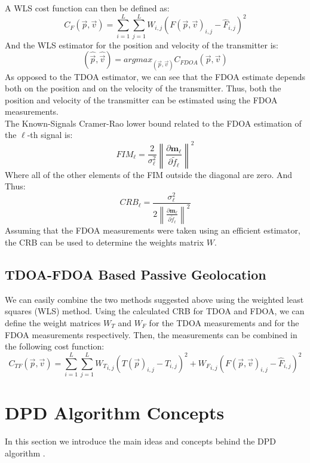 \documentclass[10pt,a4paper]{report}
\begin{document}
A WLS cost function can then be defined as:
\begin{equation}
C_F(\vec{p},\vec{v}) = \sum_{i=1}^L \sum_{j=1}^L W_{i,j}(F(\vec{p},\vec{v})_{i,j}-\hat{F}_{i,j})^2
\end{equation}
And the WLS estimator for the position and velocity of the transmitter is:
\begin{equation}
(\hat{\vec{p}},\hat{\vec{v}}) = argmax_{(\vec{p},\vec{v})}C_{FDOA}(\vec{p},\vec{v})
\end{equation}
As opposed to the TDOA estimator, we can see that the FDOA estimate depends both on the position and on the velocity of the transmitter. Thus, both the position and velocity of the transmitter can be estimated using the FDOA measurements.\\

The Known-Signals Cramer-Rao lower bound related to the FDOA estimation of the $\ell$-th signal is:
\begin{equation}
{FIM}_\ell = \frac{2}{\sigma_\ell^2}\left\|\frac{\partial \mathbf{m_\ell}}{\partial \tilde{f}_\ell}\right\|^2
\end{equation}
Where all of the other elements of the FIM outside the diagonal are zero. And Thus:
\begin{equation}
{CRB}_\ell = \frac{\sigma_\ell^2}{2\left\|\frac{\partial \mathbf{m_\ell}}{\partial \tilde{f}_\ell}\right\|^2}
\end{equation}
Assuming that the FDOA measurements were taken using an efficient estimator, the CRB can be used to determine the weights matrix $W$.

\subsection{TDOA-FDOA Based Passive Geolocation}
We can easily combine the two methods suggested above using the weighted least squares (WLS) method.
Using the calculated CRB for TDOA and FDOA, we can define the weight matrices $W_T$ and $W_F$ for the TDOA measurements and for the FDOA measurements respectively.
Then, the measurements can be combined in the following cost function:
\begin{equation}
C_{TF}(\vec{p},\vec{v}) = \sum_{i=1}^L \sum_{j=1}^L {W_T}_{i,j}(T(\vec{p})_{i,j}-\hat{T}_{i,j})^2+ {W_F}_{i,j}(F(\vec{p},\vec{v})_{i,j}-\hat{F}_{i,j})^2
\end{equation}

\section{DPD Algorithm Concepts}
In this section we introduce the main ideas and concepts behind the DPD algorithm \cite{dpd}.\\
\end{document}
